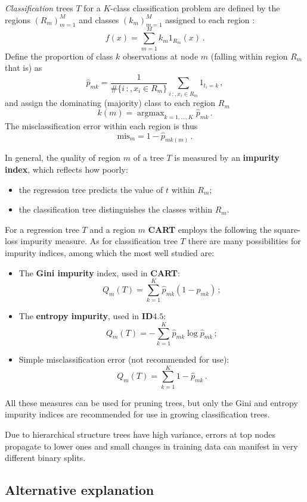 \documentclass[a4paper]{article}
\newcommand{\argmax}{\mathop{\text{argmax}}}
\begin{document}
\emph{Classification} trees $T$ for a $K$-class classification problem are defined
by the regions $(R_m)_{m=1}^M$ and classes $(k_m)_{m=1}^M$ assigned to each region :
\[ f(x) = \sum_{m=1}^M k_m 1_{R_m}(x) \,. \]
Define the proportion of class $k$ observations at node $m$ (falling within region
$R_m$ that is) as
\[ \hat{p}_{mk} = \frac{1}{\#\{i\,:,x_i\in R_m\}} \sum_{i\,:,x_i\in R_m} 1_{t_i = k} \,, \]
and assign the dominating (majority) class to each region $R_m$ 
\[ k(m) = \argmax_{k=1,\ldots,K} \hat{p}_{mk} \,. \]
The misclassification error within each region is thus
\[ \text{mis}_m = 1 - \hat{p}_{m k(m)}\,. \]

In general, the quality of region $m$ of a tree $T$ is measured by an \textbf{impurity
index}, which reflects how poorly:
\begin{itemize}
	\item the regression tree predicts the value of $t$ within $R_m$;
	\item the classification tree distinguishes the classes within $R_m$.
\end{itemize}
For a regression tree $T$ and a region $m$ \textbf{CART} employs the following
the square-loss impurity measure. As for classification tree $T$ there are many
possibilities for impurity indices, among which the most well studied are:
\begin{itemize}
	\item The \textbf{Gini impurity} index, used in \textbf{CART}:
	\[ Q_m(T) = \sum_{k=1}^K \hat{p}_{mk} (1-\hat{p}_{mk}) \,; \]
	\item The \textbf{entropy impurity}, used in \textbf{ID$4.5$}:
	\[ Q_m(T) = - \sum_{k=1}^K \hat{p}_{mk} \log \hat{p}_{mk} \,; \]
	\item Simple misclassification error (not recommended for use):
	\[ Q_m(T) = \sum_{k=1}^K 1-\hat{p}_{mk} \,.\]
\end{itemize}
All these measures can be used for pruning trees, but only the Gini and entropy
impurity indices are recommended for use in growing classification trees.

Due to hierarchical structure trees have high variance, errors at top nodes propagate
to lower ones and small changes in training data can manifest in very different binary
splits.

\subsection{Alternative explanation} %
\label{sub:alternative_explanation}
\end{document}
